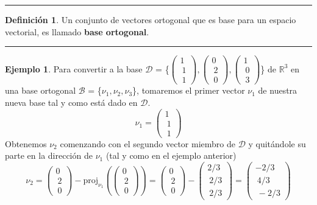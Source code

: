 \documentclass[11pt]{article}
\theoremstyle{definition}
\newtheorem{ejemplo}[ejm]{Ejemplo}
\newtheorem{definicion}[defn]{Definición}
\begin{document}
\hrule
\begin{definicion}
	Un conjunto de vectores ortogonal que es base para un espacio vectorial, es llamado \textbf{base ortogonal}.
\end{definicion}
\hrule

\begin{ejemplo}
	Para convertir a la base $\mathcal{D}$ = \{$\left(\begin{array}{c} 1 \\\ 1 \\\ 1\end{array} \right),\left(\begin{array}{c} 0 \\\ 2 \\\ 0\end{array} \right),\left(\begin{array}{c} 1 \\\ 0 \\\ 3\end{array} \right)$\} de $\mathbb{R}^3$ en una base ortogonal $\mathcal{B}$ = \{$\nu_1,\nu_2,\nu_3$\}, tomaremos el primer vector $\nu_1$ de nuestra nueva base tal y como está dado en $\mathcal{D}$.
	\[\nu_1=\left(\begin{array}{c} 1 \\\ 1 \\\ 1\end{array} \right)\]
Obtenemos $\nu_2$ comenzando con el segundo vector miembro de $\mathcal{D}$ y quitándole su parte en la dirección de $\nu_1$ (tal y como en el ejemplo anterior)
\[\nu_2 = \left(\begin{array}{c} 0 \\\ 2\\\ 0\end{array} \right) - \textrm{proj}_{\nu_1}(\left(\begin{array}{c} 0 \\\ 2\\\ 0\end{array} \right)) = \left(\begin{array}{c}0 \\\ 2\\\ 0\end{array} \right) - \left(\begin{array}{c} 2/3\\\ 2/3\\\ 2/3\end{array} \right) = \left(\begin{array}{c} -2/3 \\\ 4/3\\\ -2/3\end{array} \right)\]

\end{ejemplo}
\end{document}
